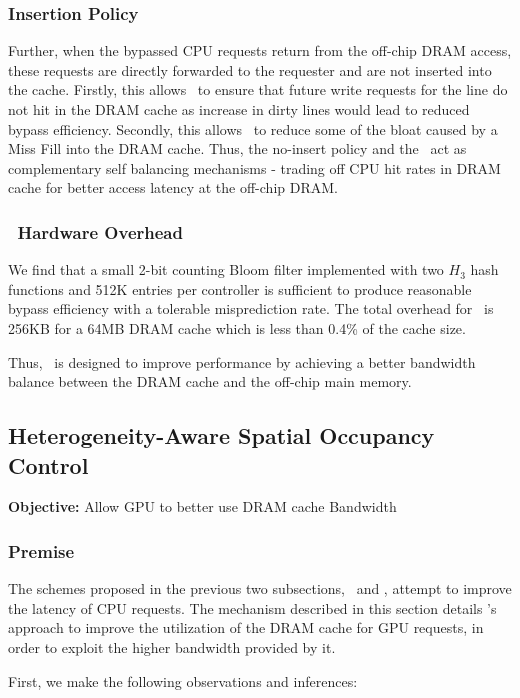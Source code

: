 \subsubsection{Insertion Policy}
\par Further, when the bypassed CPU requests return from the off-chip DRAM access, these requests are directly forwarded to the requester and are not inserted into the cache. 
Firstly, this allows \bypassname\ to ensure that future write requests for the line do not hit in the DRAM cache as increase in dirty lines would lead to reduced bypass efficiency. 
Secondly, this allows \bypassname\ to reduce some of the bloat caused by a Miss Fill \cite{bear} into the DRAM cache.
Thus, the no-insert policy and the \bypassname\ act as complementary self balancing mechanisms - trading off CPU hit rates in DRAM cache for better access latency at the off-chip DRAM.
\subsubsection{\bypassname\ Hardware Overhead}
\par We find that a small 2-bit counting Bloom filter implemented with two $H_3$ hash functions \cite{h3} and 512K entries per controller is sufficient 
to produce reasonable bypass efficiency with a tolerable misprediction rate. The total overhead for \bypassname\ is 256KB for a 64MB DRAM cache which is less than 0.4\% of the cache size.
\par Thus, \bypassname\ is designed to improve performance by achieving a better bandwidth balance between the DRAM cache and the off-chip main memory.


\subsection{Heterogeneity-Aware Spatial Occupancy Control} \label{mechanism-chaining}
\textbf{Objective:} Allow GPU to better use DRAM cache Bandwidth
\subsubsection{Premise}
The schemes proposed in the previous two subsections, \prioname\ and \bypassname, attempt to improve the latency of CPU requests. The mechanism described in this section details \cachename's approach to improve the utilization of the DRAM cache for GPU requests, in order to exploit the higher bandwidth provided by it. 
\par First, we make the following observations and inferences: 


